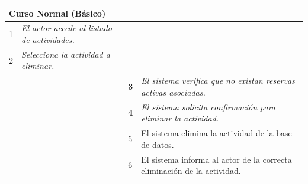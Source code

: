     \begin{table}[H]
        \begin{tabular}{llllllll}
        \hline
        \multicolumn{8}{|l|}{\cellcolor[HTML]{F2F2F2}Curso Normal (Básico)}                                                                                                                                                                                                                                                                          \\ \hline
        \multicolumn{1}{|c|}{1}  & \multicolumn{1}{l|}{{\color[HTML]{808080} \textit{El actor accede al listado de actividades.}}} & \multicolumn{1}{l|}{{\color[HTML]{808080} }}                    & \multicolumn{5}{l|}{{\color[HTML]{808080} }}                                                                                            \\ \hline
        \multicolumn{1}{|c|}{2}   & \multicolumn{1}{p{6cm}|}{{\color[HTML]{808080} \textit{Selecciona la actividad a eliminar.}}}                                                 & \multicolumn{1}{c|}{} & \multicolumn{5}{p{6cm}|}{{\color[HTML]{808080} \textit{}}}                         \\ \hline
        \multicolumn{1}{|l|}{}   & \multicolumn{1}{l|}{{\color[HTML]{808080} }}                                                          & \multicolumn{1}{l|}{{\color[HTML]{808080} \textbf{3}}}          & \multicolumn{5}{p{6cm}|}{{\color[HTML]{808080} \textit{El sistema verifica que no existan reservas activas asociadas.}}} \\ \hline
        \multicolumn{1}{|c|}{}  & \multicolumn{1}{p{6cm}|}{{\color[HTML]{808080} }} & \multicolumn{1}{l|}{{\color[HTML]{808080} \textbf{4}}}                    & \multicolumn{5}{p{6cm}|}{{\color[HTML]{808080} \textit{El sistema solicita confirmación para eliminar la actividad.}}}                                                                                            \\ \hline
        \multicolumn{1}{|l|}{}   & \multicolumn{1}{l|}{{\color[HTML]{808080} }}                                                          & \multicolumn{1}{l|}{{\color[HTML]{808080} 5}}                   & \multicolumn{5}{p{6cm}|}{{\color[HTML]{808080} El sistema elimina la actividad de la base de datos.}}                                  \\ \hline
        \multicolumn{1}{|l|}{}   & \multicolumn{1}{l|}{{\color[HTML]{808080} }}                                                          & \multicolumn{1}{l|}{{\color[HTML]{808080} 6}}                   & \multicolumn{5}{p{6cm}|}{{\color[HTML]{808080} El sistema informa al actor de la correcta eliminación de la actividad.}}                                  \\ \hline
        \end{tabular}
    \end{table}


